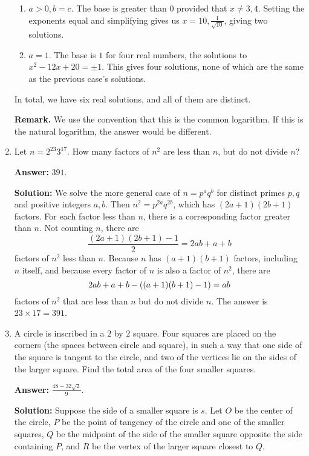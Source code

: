 \documentclass[11pt,paper=letter]{scrartcl}
\begin{document}
\begin{enumerate}[left=0pt]
\begin{enumerate}
\item $a > 0, b = c$. The base is greater than $0$ provided that $x \neq 3, 4$. Setting the exponents equal and simplifying gives us $x = 10, \frac{1}{\sqrt{10}}$, giving two solutions.

\item $a = 1$. The base is $1$ for four real numbers, the solutions to $x^2 - 12x + 20 = \pm 1$. This gives four solutions, none of which are the same as the previous case's solutions.

\end{enumerate}

In total, we have six real solutions, and all of them are distinct.

\textbf{Remark.} We use the convention that this is the common logarithm. If this is the natural logarithm, the answer would be different.

\item Let $n = 2^{23}3^{17}$. How many factors of $n^2$ are less than $n$, but do not divide $n$?

\textbf{Answer:} $\boxed{391}$.

\textbf{Solution:} We solve the more general case of $n = p^aq^b$ for distinct primes $p, q$ and positive integers $a, b$. Then $n^2 = p^{2a}q^{2b}$, which has $(2a + 1)(2b + 1)$ factors. For each factor less than $n$, there is a corresponding factor greater than $n$. Not counting $n$, there are $$\frac{(2a + 1)(2b + 1) - 1}{2} = 2ab + a + b$$ factors of $n^2$ less than $n$. Because $n$ has $(a + 1)(b + 1)$ factors, including $n$ itself, and because every factor of $n$ is also a factor of $n^2$, there are $$2ab + a + b - \left( (a+1)(b+1) - 1 \right) = ab$$ factors of $n^2$ that are less than $n$ but do not divide $n$. The answer is $23 \times 17 = 391$.

\item A circle is inscribed in a $2$ by $2$ square. Four squares are placed on the corners (the spaces between circle and square), in such a way that one side of the square is tangent to the circle, and two of the vertices lie on the sides of the larger square. Find the total area of the four smaller squares.

\textbf{Answer:} $\boxed{\frac{48 - 32\sqrt{2}}{9}}$.

\textbf{Solution:} Suppose the side of a smaller square is $s$. Let $O$ be the center of the circle, $P$ be the point of tangency of the circle and one of the smaller squares, $Q$ be the midpoint of the side of the smaller square opposite the side containing $P$, and $R$ be the vertex of the larger square closest to $Q$.


\end{enumerate}
\end{document}
